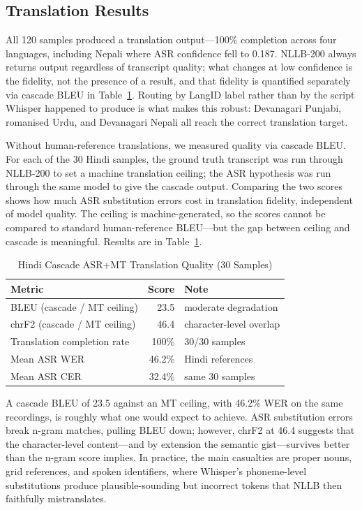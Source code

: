 \documentclass[12pt, onecolumn]{IEEEtran}
\begin{document}
\subsection{Translation Results}
\label{sec:trans}

All 120 samples produced a translation output---100\% completion across four languages, including Nepali where ASR confidence fell to 0.187. NLLB-200 always returns output regardless of transcript quality; what changes at low confidence is the fidelity, not the presence of a result, and that fidelity is quantified separately via cascade BLEU in Table~\ref{tab:bleu}. Routing by LangID label rather than by the script Whisper happened to produce is what makes this robust: Devanagari Punjabi, romanised Urdu, and Devanagari Nepali all reach the correct translation target.

Without human-reference translations, we measured quality via cascade BLEU. For each of the 30 Hindi samples, the ground truth transcript was run through NLLB-200 to set a machine translation ceiling; the ASR hypothesis was run through the same model to give the cascade output. Comparing the two scores shows how much ASR substitution errors cost in translation fidelity, independent of model quality. The ceiling is machine-generated, so the scores cannot be compared to standard human-reference BLEU---but the gap between ceiling and cascade is meaningful. Results are in Table~\ref{tab:bleu}.

\begin{table}[htbp]
\caption{Hindi Cascade ASR+MT Translation Quality (30 Samples)}
\label{tab:bleu}
\begin{center}
\begin{tabular}{lrl}
\toprule
\textbf{Metric} & \textbf{Score} & \textbf{Note} \\
\midrule
BLEU (cascade / MT ceiling) & 23.5 & moderate degradation \\
chrF2 (cascade / MT ceiling) & 46.4 & character-level overlap \\
Translation completion rate  & 100\% & 30/30 samples \\
Mean ASR WER                 & 46.2\% & Hindi references \\
Mean ASR CER                 & 32.4\% & same 30 samples \\
\bottomrule
\end{tabular}
\end{center}
\end{table}

A cascade BLEU of 23.5 against an MT ceiling, with 46.2\% WER on the same recordings, is roughly what one would expect to achieve. ASR substitution errors break n-gram matches, pulling BLEU down; however, chrF2 at 46.4 suggests that the character-level content---and by extension the semantic gist---survives better than the n-gram score implies. In practice, the main casualties are proper nouns, grid references, and spoken identifiers, where Whisper's phoneme-level substitutions produce plausible-sounding but incorrect tokens that NLLB then faithfully mistranslates.
\end{document}
